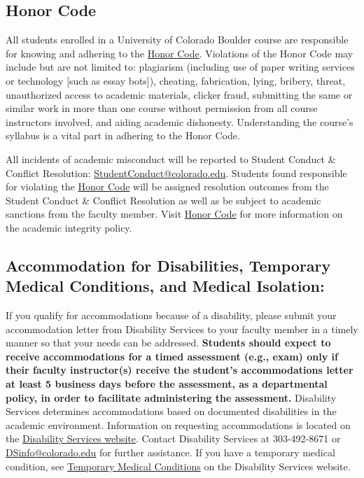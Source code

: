\subsection*{Honor Code}
All students enrolled in a University of Colorado Boulder course are responsible for knowing and adhering to the \href{https://www.colorado.edu/sccr/media/229}{Honor Code}. Violations of the Honor Code may include but are not limited to: plagiarism (including use of paper writing services or technology [such as essay bots]), cheating, fabrication, lying, bribery, threat, unauthorized access to academic materials, clicker fraud, submitting the same or similar work in more than one course without permission from all course instructors involved, and aiding academic dishonesty. Understanding the course's syllabus is a vital part in adhering to the Honor Code.

All incidents of academic misconduct will be reported to Student Conduct \& Conflict Resolution: \href{mailto:StudentConduct@colorado.edu}{StudentConduct@colorado.edu}. Students found responsible for violating the \href{https://www.colorado.edu/sccr/media/229}{Honor Code} will be assigned resolution outcomes from the Student Conduct \& Conflict Resolution as well as be subject to academic sanctions from the faculty member. Visit \href{https://www.colorado.edu/sccr/media/229}{Honor Code} for more information on the academic integrity policy. 

\subsection*{Accommodation for Disabilities, Temporary Medical Conditions, and Medical Isolation:}
If you qualify for accommodations because of a disability, please submit your accommodation letter from Disability Services to your faculty member in a timely manner so that your needs can be addressed. \textbf{Students should expect to receive accommodations for a timed assessment (e.g., exam) only if their faculty instructor(s) receive the student's accommodations letter at least 5 business days before the assessment, as a departmental policy, in order to facilitate administering the assessment.} Disability Services determines accommodations based on documented disabilities in the academic environment.  Information on requesting accommodations is located on the \href{https://www.colorado.edu/disabilityservices/}{Disability Services website}. Contact Disability Services at 303-492-8671 or \href{mailto:DSinfo@colorado.edu}{DSinfo@colorado.edu} for further assistance. If you have a temporary medical condition, see \href{https://www.colorado.edu/disabilityservices/students/temporary-medical-conditions}{Temporary Medical Conditions} on the Disability Services website.

